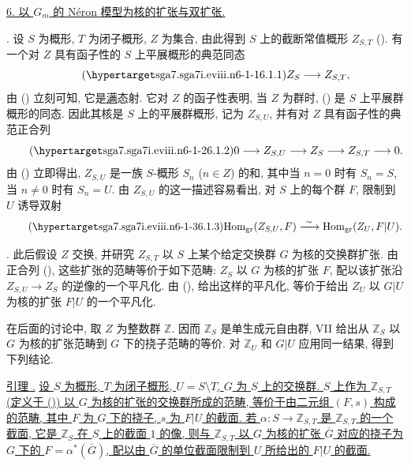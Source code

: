 \medskip
\noindent\underline{6. 以 $G_m$ 的 N\'eron 模型为核的扩张与双扩张.}

\medskip
\noindent {}. 设 $S$ 为概形, $T$ 为闭子概形, $Z$ 为集合, 由此得到 $S$ 上的截断常值概形 $Z_{S,T}$ (). 有一个对 $Z$ 具有函子性的 $S$ 上平展概形的典范同态
\begin{equation}\tag{\SGARefTarget{sga7.sga7i.eviii.n6-1-1}{6.1.1}}
 Z_S\longrightarrow Z_{S,T},
\end{equation}
由 () 立刻可知, 它是\underline{满}态射. 它对 $Z$ 的函子性表明, 当 $Z$ 为群时, () 是 $S$ 上平展群概形的同态. 因此其核是 $S$ 上的平展群概形, 记为 $Z_{S,U}$, 并有对 $Z$ 具有函子性的典范正合列
\begin{equation}\tag{\SGARefTarget{sga7.sga7i.eviii.n6-1-2}{6.1.2}}
 0\longrightarrow Z_{S,U}\longrightarrow Z_S\longrightarrow Z_{S,T}
 \longrightarrow 0.
\end{equation}
由 () 立即得出, $Z_{S,U}$ 是一族 $S$-概形 $S_n$ ($n\in Z$) 的和, 其中当 $n=0$ 时有 $S_n=S$, 当 $n\ne0$ 时有 $S_n=U$. 由 $Z_{S,U}$ 的这一描述容易看出, 对 $S$ 上的每个群 $F$, 限制到 $U$ 诱导双射
\begin{equation}\tag{\SGARefTarget{sga7.sga7i.eviii.n6-1-3}{6.1.3}}
 \mathrm{Hom}_{\mathrm{gr}}(Z_{S,U},F)
 \xrightarrow{\ \sim\ }
 \mathrm{Hom}_{\mathrm{gr}}(Z_U,F|U).
\end{equation}

\medskip
\noindent {}. 此后假设 $Z$ 交换, 并研究 $Z_{S,T}$ 以 $S$ 上某个给定交换群 $G$ 为核的交换群扩张. 由正合列 (), 这些扩张的范畴等价于如下范畴: $Z_S$ 以 $G$ 为核的扩张 $F$, 配以该扩张沿 $Z_{S,U}\to Z_S$ 的逆像的一个平凡化. 由 (), 给出这样的平凡化, 等价于给出 $Z_U$ 以 $G|U$ 为核的扩张 $F|U$ 的一个平凡化.

在后面的讨论中, 取 $Z$ 为整数群 $\mathbb Z$. 因而 $\mathbb Z_S$ 是单生成元自由群, VII  给出从 $\mathbb Z_S$ 以 $G$ 为核的扩张范畴到 $G$ 下的挠子范畴的等价. 对 $\mathbb Z_U$ 和 $G|U$ 应用同一结果, 得到下列结论.

\medskip
\noindent\underline{引理 .} \underline{设 $S$ 为概形, $T$ 为闭子概形, $U=S\setminus T$, $G$ 为 $S$ 上的交换群. $S$ 上作为 $\mathbb Z_{S,T}$ (定义于 ()) 以 $G$ 为核的扩张的交换群所成的范畴, 等价于由二元组 $(F,s)$ 构成的范畴, 其中 $F$ 为 $G$ 下的挠子, $s$ 为 $F|U$ 的截面. 若 $\alpha:S\to\mathbb Z_{S,T}$ 是 $\mathbb Z_{S,T}$ 的一个截面, 它是 $\mathbb Z_S$ 在 $S$ 上的截面 $1$ 的像, 则与 $\mathbb Z_{S,T}$ 以 $G$ 为核的扩张 $\overline G$ 对应的挠子为 $G$ 下的 $F=\alpha^*(\overline G)$, 配以由 $\overline G$ 的单位截面限制到 $U$ 所给出的 $F|U$ 的截面.}


